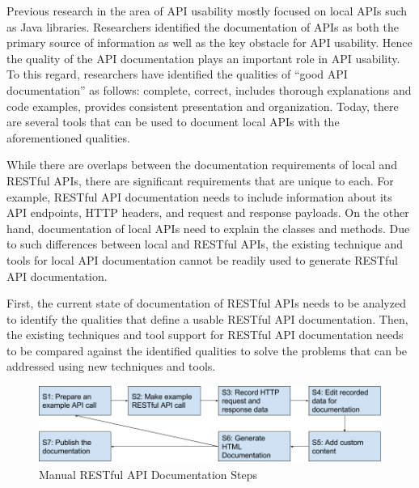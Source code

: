 \documentclass[11pt,oneside]{book}
\begin{document}
Previous research in the area of API usability mostly focused on local APIs such as Java libraries. Researchers identified the documentation of APIs as both the primary source of information as well as the key obstacle for API usability. Hence the quality of the API documentation plays an important role in API usability. To this regard, researchers have identified the qualities of ``good API documentation'' as follows: complete, correct, includes thorough explanations and code examples, provides consistent presentation and organization. Today, there are several tools that can be used to document local APIs with the aforementioned qualities.

While there are overlaps between the documentation requirements of local and RESTful APIs, there are significant requirements that are unique to each. For example, RESTful API documentation needs to include information about its API endpoints, HTTP headers, and request and response payloads. On the other hand, documentation of local APIs need to explain the classes and methods. Due to such differences between local and RESTful APIs, the existing technique and tools for local API documentation cannot be readily used to generate RESTful API documentation.

First, the current state of documentation of RESTful APIs needs to be analyzed to identify the qualities that define a usable RESTful API documentation. Then, the existing techniques and tool support for RESTful API documentation needs to be compared against the identified qualities to solve the problems that can be addressed using new techniques and tools.

\begin{figure}[htb]
  \includegraphics[width=\linewidth]{manual_workflow.png}
  \caption{Manual RESTful API Documentation Steps}
  \label{fig:manual}
\end{figure}
\end{document}
